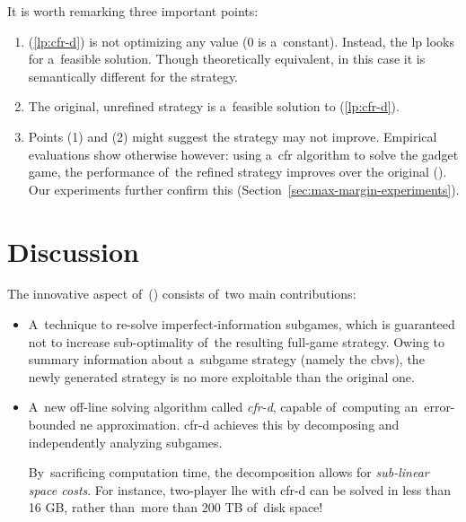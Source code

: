 It is worth remarking three important points:
\begin{enumerate}[(1)]
  \item (\ref{lp:cfr-d}) is not optimizing any value ($0$ is a~constant).
    Instead, the \acrshort{lp} looks for a~feasible solution.
    Though theoretically equivalent, in this case it is semantically different for the strategy.
  \item The original, unrefined strategy is a~feasible solution to (\ref{lp:cfr-d}).
  \item Points (1) and (2) might suggest the strategy may not improve.
    Empirical evaluations show otherwise however:
    using a~\acrshort{cfr} algorithm to solve the gadget game, the performance of~the refined strategy improves over the original (\cite{BurchJohansonBowling2014}).
    Our experiments further confirm this (Section~\ref{sec:max-margin-experiments}).
\end{enumerate}

\section{Discussion}
The innovative aspect of~(\cite{BurchJohansonBowling2014}) consists of~two main contributions:
\begin{itemize}[(i)]
  \item A~technique to re-solve imperfect-information subgames, which is guaranteed not to increase sub-optimality of~the resulting full-game strategy.
    Owing to summary information about a~subgame strategy (namely the \acrlong{cbv}s), the newly generated strategy is no more exploitable than the original one.

  \item A~new off-line solving algorithm called \emph{\acrfull{cfr-d}}, capable of~computing an~error-bounded \acrshort{ne} approximation.
    \acrshort{cfr-d} achieves this by decomposing and independently analyzing subgames.

    By~sacrificing computation time, the decomposition allows for \emph{sub-linear space costs}.
    For instance, two-player \acrshort{lhe} with \acrshort{cfr-d} can be solved in less than 16 GB, rather than~more than 200 TB of~disk space!
\end{itemize}
